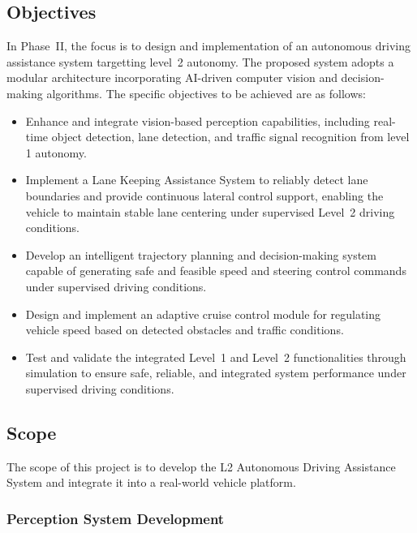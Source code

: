 \documentclass[12pt, a4paper]{report}
\begin{document}
\subsection{Objectives}

In Phase~II, the focus is to design and implementation of an autonomous driving assistance system targetting level~2 autonomy. The proposed system adopts a modular architecture incorporating AI-driven computer vision and decision-making algorithms. The specific objectives to be achieved are as follows:

\begin{itemize}
    \item Enhance and integrate vision-based perception capabilities, including real-time object detection, lane detection, and traffic signal recognition from level 1 autonomy.
    
    \item Implement a Lane Keeping Assistance System to reliably detect lane boundaries and provide continuous lateral control support, enabling the vehicle to maintain stable lane centering under supervised Level~2 driving conditions.
    
    \item Develop an intelligent trajectory planning and decision-making system capable of generating safe and feasible speed and steering control commands under supervised driving conditions.
    
    \item Design and implement an adaptive cruise control module for regulating vehicle speed based on detected obstacles and traffic conditions.
  
    \item Test and validate the integrated Level~1 and Level~2 functionalities through simulation to ensure safe, reliable, and integrated system performance under supervised driving conditions.
  \end{itemize}

\subsection{Scope}

The scope of this project is to develop the L2 Autonomous Driving Assistance System and integrate it into a real-world vehicle platform.

\subsubsection{Perception System Development}
\end{document}
